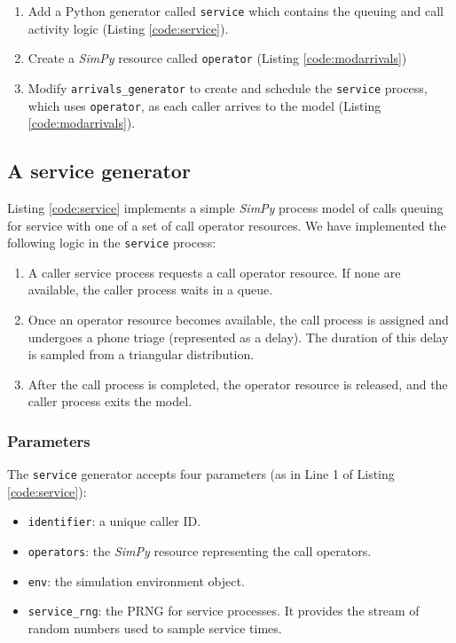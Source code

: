 \documentclass{swpaperproc}
\theoremstyle{sw}
\begin{document}
\begin{enumerate}
    \item Add a Python generator called \verb|service| which contains the queuing and call activity logic (Listing \ref{code:service}).
    \item Create a \textit{SimPy} resource called \verb|operator| (Listing \ref{code:modarrivals})
    \item Modify \verb|arrivals_generator| to create and schedule the \verb|service| process, which uses \verb|operator|, as each caller arrives to the model (Listing \ref{code:modarrivals}).
\end{enumerate}

\subsection{A service generator}

Listing \ref{code:service} implements a simple \textit{SimPy} process model of calls queuing for service with one of a set of call operator resources. We have implemented the following logic in the \verb|service| process:

\begin{enumerate}
    \item A caller service process requests a call operator resource. If none are available, the caller process waits in a queue.
    \item Once an operator resource becomes available, the call process is assigned and undergoes a phone triage (represented as a delay). The duration of this delay is sampled from a triangular distribution.
    \item  After the call process is completed, the operator resource is released, and the caller process exits the model.
\end{enumerate}



\subsubsection{Parameters}

The \verb|service| generator accepts four parameters (as in Line 1 of Listing \ref{code:service}):

\begin{itemize}
    \item \verb|identifier|: a unique caller ID.
    \item \verb|operators|: the \textit{SimPy} resource representing the call operators.
    \item \verb|env|: the simulation environment object.
    \item \verb|service_rng|: the PRNG for service processes. It provides the stream of random numbers used to sample service times. 
\end{itemize}
\end{document}
